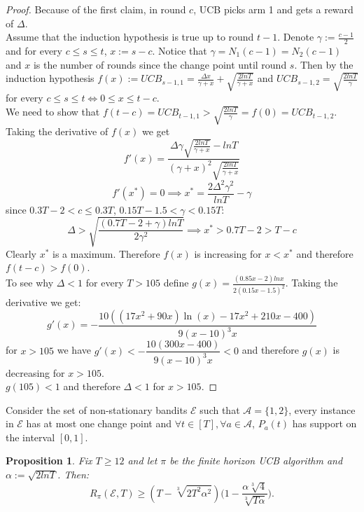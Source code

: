 \documentclass[opre,nonblindrev]{informs3} %
\newtheorem{proposition}{Proposition}
\begin{document}
\begin{proof}
Because of the first claim, in round $c$, UCB picks arm 1 and gets a reward of $\Delta$.\\
Assume that the induction hypothesis is true up to round $t-1$. Denote $\gamma := \frac{c-1}{2}$ and for every $c \leq s \leq t$, $x := s - c$. Notice that $\gamma = N_1(c-1) = N_2(c-1)$ and $x$ is the number of rounds since the change point until round $s$.
Then by the induction hypothesis $f(x) := UCB_{s-1, 1} = \frac{\Delta x}{\gamma + x} + \sqrt{\frac{2lnT}{\gamma + x}}$ and $UCB_{s-1, 2} = \sqrt{\frac{2lnT}{\gamma}}$ for every $c \leq s \leq t \iff 0 \leq x \leq t-c$. \\
We need to show that $f(t-c) = UCB_{t-1, 1} > \sqrt{\frac{2lnT}{\gamma}} = f(0) = UCB_{t-1, 2}$. 
Taking the derivative of $f(x)$ we get $$f'(x) = \frac{\Delta\gamma\sqrt{\frac{2lnT}{\gamma+x}}-lnT}{(\gamma+x)^2\sqrt{\frac{2lnT}{\gamma+x}}}$$
\[
f'(x^*) = 0 \implies x^* = \frac{2\Delta^2\gamma^2}{lnT} - \gamma
\]
since $0.3T - 2 < c \leq 0.3T$, $0.15T - 1.5 < \gamma < 0.15T$:
\[
\Delta > \sqrt{\frac{(0.7T-2 + \gamma)lnT}{2\gamma^2}} \implies x^*>0.7T - 2 > T - c
\]
Clearly $x^*$ is a maximum. Therefore $f(x)$ is increasing for $x<x^*$ and therefore $f(t-c) > f(0)$. \\
To see why $\Delta < 1$ for every $T>105$ define $g(x) = \frac{(0.85x-2)lnx}{2(0.15x-1.5)^2}$.
Taking the derivative we get:
$$g'(x) = -\dfrac{10((17x^2+90x)\ln(x)-17x^2+210x-400)}{9(x-10)^3x}$$
for $x>105$ we have $g'(x) < -\dfrac{10(300x-400)}{9(x-10)^3x} < 0$ and therefore $g(x)$ is decreasing for $x > 105$.\\
$g(105) < 1$ and therefore $\Delta<1$ for $x>105$.  
\end{proof}

Consider the set of non-stationary bandits $\mathcal{E}$ such that $\mathcal{A} = \{1, 2\}$, every instance in $\mathcal{E}$ has at most one change point and $\forall t \in [T], \forall a\in \mathcal{A}$, $P_a(t)$ has support on the interval $[0, 1]$. 
\begin{proposition}
    Fix $T\geq12$ and let $\pi$ be the finite horizon UCB algorithm and $\alpha := \sqrt{2lnT}$. Then:
    \begin{equation}
        R_{\pi}(\mathcal{E}, T) \geq (T-\sqrt[3]{2T^2\alpha^2})\bigg(1-\frac{\alpha\sqrt[3]{4}}{\sqrt[3]{T\alpha}}\bigg).
    \end{equation}
    \label{prop:UCB_strong_lower_bound}
\end{proposition}
\end{document}
